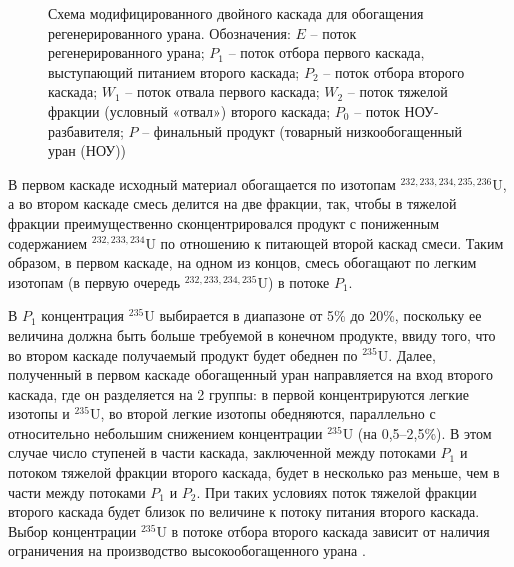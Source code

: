 \begin{figure}[ht]
    \caption{Схема модифицированного двойного каскада для обогащения регенерированного урана. Обозначения: $E$ -- поток регенерированного урана; $P_1$ -- поток отбора первого каскада, выступающий питанием второго каскада; $P_2$ -- поток отбора второго каскада; $W_1$ -- поток отвала первого каскада; $W_2$ -- поток тяжелой фракции (условный «отвал») второго каскада; $P_0$ -- поток НОУ-разбавителя; $P$ -- финальный продукт (товарный низкообогащенный уран (НОУ))}\label{p2left}
\end{figure}

В первом каскаде исходный материал обогащается по изотопам $^{232,233,234,235,236}$U, а во втором каскаде смесь делится на две фракции, так, чтобы в тяжелой фракции преимущественно сконцентрировался продукт с пониженным содержанием $^{232,233,234}$U по отношению к питающей второй каскад смеси. Таким образом, в первом каскаде, на одном из концов, смесь обогащают по легким изотопам (в первую очередь $^{232,233,234,235}$U) в потоке $P_1$.

В $P_1$ концентрация $^{235}$U выбирается в диапазоне от 5\% до 20\%, поскольку ее величина должна быть больше требуемой в конечном продукте, ввиду того, что во втором каскаде получаемый продукт будет обеднен по $^{235}$U. Далее, полученный в первом каскаде обогащенный уран направляется на вход второго каскада, где он разделяется на 2 группы: в первой концентрируются легкие изотопы и $^{235}$U, во второй легкие изотопы обедняются, параллельно с относительно небольшим снижением концентрации $^{235}$U (на 0,5–2,5\%). В этом случае число ступеней в части каскада, заключенной между потоками $P_1$ и потоком тяжелой фракции второго каскада, будет в несколько раз меньше, чем в части между потоками $P_1$ и $P_2$. При таких условиях поток тяжелой фракции второго каскада будет близок по величине к потоку питания второго каскада.
Выбор концентрации $^{235}$U в потоке отбора второго каскада зависит от наличия ограничения на производство высокообогащенного урана \cite{brownOriginsSignificanceLimit2016}.

